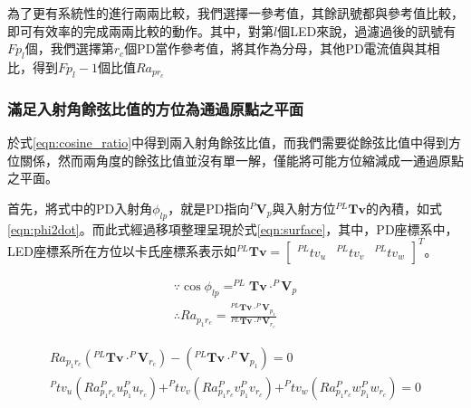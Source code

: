         為了更有系統性的進行兩兩比較，我們選擇一參考值，其餘訊號都與參考值比較，即可有效率的完成兩兩比較的動作。其中，對第$l$個LED來說，過濾過後的訊號有$Fp_l$個，我們選擇第$r_c$個PD當作參考值，將其作為分母，其他PD電流值與其相比，得到$Fp_l-1$個比值$Ra_{pr_c}$

    \subsubsection{滿足入射角餘弦比值的方位為通過原點之平面}
    \label{chp:solve_surface}
        
        於式\ref{eqn:cosine_ratio}中得到兩入射角餘弦比值，而我們需要從餘弦比值中得到方位關係，然而兩角度的餘弦比值並沒有單一解，僅能將可能方位縮減成一通過原點之平面。
        
        首先，將式中的PD入射角$\phi_{lp}$，就是PD指向$^P\boldsymbol{V}_p$與入射方位$^{PL}\boldsymbol{Tv}$的內積，如式\ref{eqn:phi2dot}。而此式經過移項整理呈現於式\ref{eqn:surface}，其中，PD座標系中，LED座標系所在方位以卡氏座標系表示如$^{PL}\boldsymbol{Tv}=\left[\begin{array}{ccc}^{PL}tv_u&^{PL}tv_v&^{PL}tv_w\end{array}\right]^T$。
     

        \begin{equation}
            \label{eqn:phi2dot}
            \begin{aligned}
                \because \cos\phi_{lp} = ^{PL}\boldsymbol{Tv}\cdot^P\boldsymbol{V}_p\\
                \therefore Ra_{p_1r_c}
                =\frac{^{PL}\boldsymbol{Tv}\cdot^P\boldsymbol{V}_{p_1}}{^{PL}\boldsymbol{Tv}\cdot^P\boldsymbol{V}_{r_c}}
            \end{aligned}
        \end{equation}
            
            \begin{gather}
                \label{eqn:surface}
                 Ra_{p_1r_c}({^{PL}\boldsymbol{Tv}\cdot^P\boldsymbol{V}_{r_c}})-({^{PL}\boldsymbol{Tv}\cdot^P\boldsymbol{V}_{p_1}})=0\\
                 \label{eqn:surface_normal}
                 ^{P}tv_u(Ra_{p_1r_c}^{P}u_{p_1}^{P}u_{r_c})
                 +^{P}tv_v(Ra_{p_1r_c}^{P}v_{p_1}^{P}v_{r_c})
                 +^{P}tv_w(Ra_{p_1r_c}^{P}w_{p_1}^{P}w_{r_c})=0
            \end{gather}

